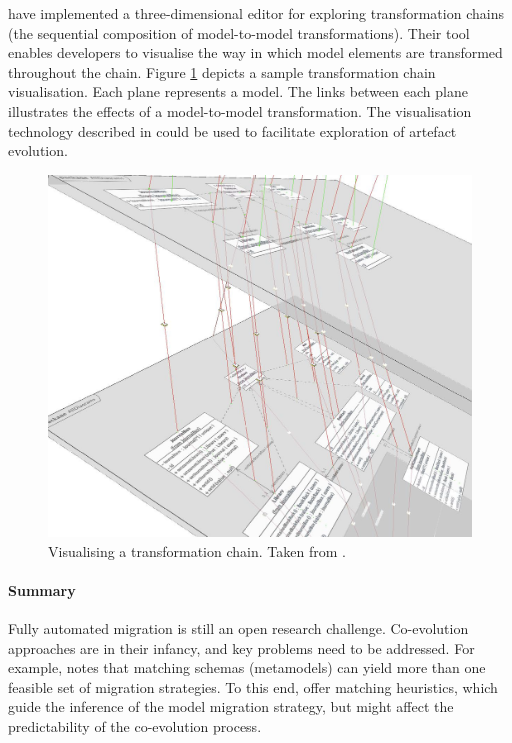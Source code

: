 \cite{pilgrim08constructing} have implemented a three-dimensional editor for exploring transformation chains (the sequential composition of model-to-model transformations). Their tool enables developers to visualise the way in which model elements are transformed throughout the chain. Figure \ref{fig:transformation-chains} depicts a sample transformation chain visualisation. Each plane represents a model. The links between each plane illustrates the effects of a model-to-model transformation. The visualisation technology described in \cite{pilgrim08constructing} could be used to facilitate exploration of artefact evolution.


\begin{figure}[htbp]
  \begin{center}
    \leavevmode
    \includegraphics[scale=0.25]{3.LiteratureReview/images/transformation-chain.png}
  \end{center}
  \caption[Visualising a transformation chain]{Visualising a transformation chain. Taken from \cite{pilgrim08constructing}.}
  \label{fig:transformation-chains}
\end{figure}

\paragraph{Summary}
Fully automated migration is still an open research challenge. Co-evolution approaches are in their infancy, and key problems need to be addressed. For example, \cite{lerner00model} notes that matching schemas (metamodels) can yield more than one feasible set of migration strategies. To this end, \cite{garces09managing} offer matching heuristics, which guide the inference of the model migration strategy, but might affect the predictability of the co-evolution process. 

